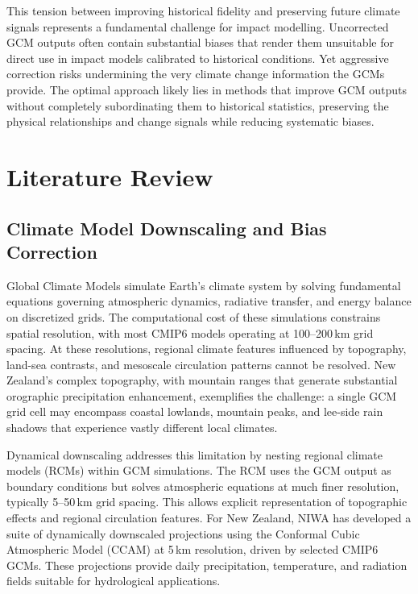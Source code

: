 This tension between improving historical fidelity and preserving future climate signals 
represents a fundamental challenge for impact modelling. Uncorrected GCM outputs often contain 
substantial biases that render them unsuitable for direct use in impact models calibrated to 
historical conditions. Yet aggressive correction risks undermining the very climate change 
information the GCMs provide. The optimal approach likely lies in methods that improve GCM 
outputs without completely subordinating them to historical statistics, preserving the physical 
relationships and change signals while reducing systematic biases.

\chapter{Literature Review}

\section{Climate Model Downscaling and Bias Correction}

Global Climate Models simulate Earth's climate system by solving fundamental equations 
governing atmospheric dynamics, radiative transfer, and energy balance on discretized grids. 
The computational cost of these simulations constrains spatial resolution, with most CMIP6 
models operating at 100--200\,km grid spacing. At these resolutions, regional climate features 
influenced by topography, land-sea contrasts, and mesoscale circulation patterns cannot be 
resolved. New Zealand's complex topography, with mountain ranges that generate substantial 
orographic precipitation enhancement, exemplifies the challenge: a single GCM grid cell may 
encompass coastal lowlands, mountain peaks, and lee-side rain shadows that experience vastly 
different local climates.

Dynamical downscaling addresses this limitation by nesting regional climate models (RCMs) 
within GCM simulations. The RCM uses the GCM output as boundary conditions but solves 
atmospheric equations at much finer resolution, typically 5--50\,km grid spacing. This allows 
explicit representation of topographic effects and regional circulation features. For New 
Zealand, NIWA has developed a suite of dynamically downscaled projections using the Conformal 
Cubic Atmospheric Model (CCAM) at 5\,km resolution, driven by selected CMIP6 GCMs. These 
projections provide daily precipitation, temperature, and radiation fields suitable for 
hydrological applications.

